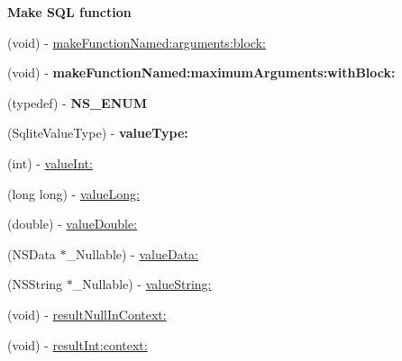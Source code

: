 \begin{Indent}\textbf{ Make S\+QL function}\par
{\em 

 

 }\begin{DoxyCompactItemize}
\item 
(void) -\/ \mbox{\hyperlink{interface_o_p_t_l_y_f_m_d_b_database_af2c3e10041c8d0a95e2feb84a2ffa645}{make\+Function\+Named\+:arguments\+:block\+:}}
\item 
\mbox{\label{interface_o_p_t_l_y_f_m_d_b_database_a2361ae36cc7de06a9a5922baf0fdc35c}} 
(void) -\/ {\bfseries make\+Function\+Named\+:maximum\+Arguments\+:with\+Block\+:}
\item 
\mbox{\label{interface_o_p_t_l_y_f_m_d_b_database_ab820cc7df63b06209a24ae5660025852}} 
(typedef) -\/ {\bfseries N\+S\+\_\+\+E\+N\+UM}
\item 
\mbox{\label{interface_o_p_t_l_y_f_m_d_b_database_aa2bc57e60b8571485b851ab26ce616e7}} 
(Sqlite\+Value\+Type) -\/ {\bfseries value\+Type\+:}
\item 
(int) -\/ \mbox{\hyperlink{interface_o_p_t_l_y_f_m_d_b_database_ae86df2d5f08b22824e4f5c14fb436b7a}{value\+Int\+:}}
\item 
(long long) -\/ \mbox{\hyperlink{interface_o_p_t_l_y_f_m_d_b_database_aebdb8f230b7998ffa60011e4ebba56cc}{value\+Long\+:}}
\item 
(double) -\/ \mbox{\hyperlink{interface_o_p_t_l_y_f_m_d_b_database_aa7c954c5231ffbb5843f9a4893b7761b}{value\+Double\+:}}
\item 
(N\+S\+Data $\ast$\+\_\+\+Nullable) -\/ \mbox{\hyperlink{interface_o_p_t_l_y_f_m_d_b_database_a8ad2d164fca13ab7f1818c039bda56ec}{value\+Data\+:}}
\item 
(N\+S\+String $\ast$\+\_\+\+Nullable) -\/ \mbox{\hyperlink{interface_o_p_t_l_y_f_m_d_b_database_ab21c078e774eff96b5bcbd0d2c66823b}{value\+String\+:}}
\item 
(void) -\/ \mbox{\hyperlink{interface_o_p_t_l_y_f_m_d_b_database_aba9df34d2c12d9e68c205e3ae2234400}{result\+Null\+In\+Context\+:}}
\item 
(void) -\/ \mbox{\hyperlink{interface_o_p_t_l_y_f_m_d_b_database_adc1fa43c23f123a21fa106f9a7f6482f}{result\+Int\+:context\+:}}
\item 

\end{DoxyCompactItemize}
\end{Indent}
